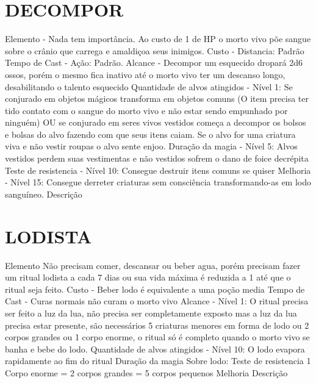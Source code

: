\documentclass{article}%
\begin{document}
%
\section{DECOMPOR}%
\label{sec:DECOMPOR}%
Elemento {-}  Nada tem importância. Ao custo de 1 de HP o morto vivo põe sangue sobre o crânio que carrega e amaldiçoa seus inimigos.\newline%
Custo {-} Distancia: Padrão\newline%
Tempo de Cast {-} Ação: Padrão.\newline%
Alcance {-} Decompor um esquecido dropará 2d6 ossos, porém o mesmo fica inativo até o morto vivo ter um descanso longo, desabilitando o talento esquecido\newline%
Quantidade de alvos atingidos {-} Nível 1: Se conjurado em objetos mágicos transforma em objetos comuns (O item precisa ter tido contato com o sangue do morto vivo e não estar sendo empunhado por ninguém) OU se conjurado em seres vivos vestidos começa a decompor os bolsos e bolsas do alvo fazendo com que seus itens caiam. Se o alvo for uma criatura viva e não vestir roupas o alvo sente enjoo.\newline%
Duração da magia {-} Nível 5: Alvos vestidos perdem suas vestimentas e não vestidos sofrem o dano de foice decrépita\newline%
Teste de resistencia {-} Nível 10: Consegue destruir itens comuns se quiser\newline%
Melhoria {-} Nível 15: Consegue derreter criaturas sem consciência transformando{-}as em lodo sanguíneo.\newline%
Descrição \newline%

%
\section{LODISTA}%
\label{sec:LODISTA}%
Elemento Não precisam comer, descansar ou beber agua, porém precisam fazer um ritual lodista a cada 7 dias ou sua vida máxima é reduzida a 1 até que o ritual seja feito.\newline%
Custo {-} Beber lodo é equivalente a uma poção media\newline%
Tempo de Cast {-} Curas normais não curam o morto vivo\newline%
Alcance {-} Nível 1:  O ritual precisa ser feito a luz da lua, não precisa ser completamente exposto mas a luz da lua precisa estar presente, são necessários 5 criaturas menores em forma de lodo ou 2 corpos grandes ou 1 corpo enorme, o ritual só é completo quando o morto vivo se banha e bebe do lodo.\newline%
Quantidade de alvos atingidos {-} Nível 10: O lodo evapora rapidamente ao fim do ritual\newline%
Duração da magia Sobre lodo:\newline%
Teste de resistencia 1 Corpo enorme = 2 corpos grandes = 5 corpos pequenos\newline%
Melhoria \newline%
Descrição \newline%
\end{document}
